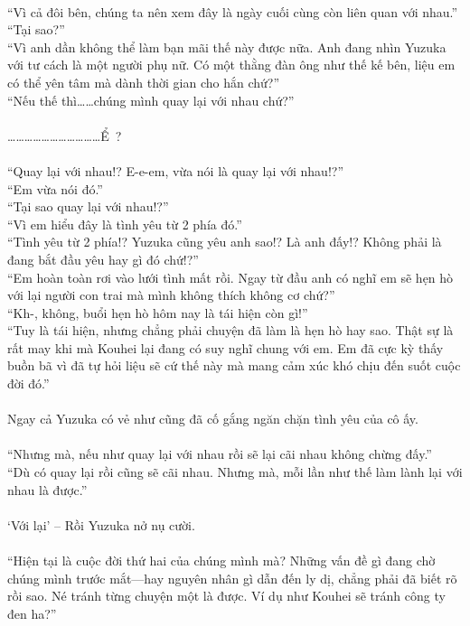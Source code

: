 \documentclass[12pt,a4paper, twosides]{book}
\begin{document}
\\
“Vì cả đôi bên, chúng ta nên xem đây là ngày cuối cùng còn liên quan với nhau.”\\
“Tại sao?”\\
“Vì anh dần không thể làm bạn mãi thế này được nữa. Anh đang nhìn Yuzuka với tư cách là một người phụ nữ. Có một thằng đàn ông như thế kế bên, liệu em có thể yên tâm mà dành thời gian cho hắn chứ?”\\
“Nếu thế thì……chúng mình quay lại với nhau chứ?”\\
\\
……………………………Ể~?\\
\\
“Quay lại với nhau!? E-e-em, vừa nói là quay lại với nhau!?”\\
“Em vừa nói đó.”\\
“Tại sao quay lại với nhau!?”\\
“Vì em hiểu đây là tình yêu từ 2 phía đó.”\\
“Tình yêu từ 2 phía!? Yuzuka cũng yêu anh sao!? Là anh đấy!? Không phải là đang bắt đầu yêu hay gì đó chứ!?”\\
“Em hoàn toàn rơi vào lưới tình mất rồi. Ngay từ đầu anh có nghĩ em sẽ hẹn hò với lại người con trai mà mình không thích không cơ chứ?”\\
“Kh-, không, buổi hẹn hò hôm nay là tái hiện còn gì!”\\
“Tuy là tái hiện, nhưng chẳng phải chuyện đã làm là hẹn hò hay sao. Thật sự là rất may khi mà Kouhei lại đang có suy nghĩ chung với em. Em đã cực kỳ thấy buồn bã vì đã tự hỏi liệu sẽ cứ thế này mà mang cảm xúc khó chịu đến suốt cuộc đời đó.”\\
\\
Ngay cả Yuzuka có vẻ như cũng đã cố gắng ngăn chặn tình yêu của cô ấy.\\
\\
“Nhưng mà, nếu như quay lại với nhau rồi sẽ lại cãi nhau không chừng đấy.”\\
“Dù có quay lại rồi cũng sẽ cãi nhau. Nhưng mà, mỗi lần như thế làm lành lại với nhau là được.”\\
\\
‘Với lại’ – Rồi Yuzuka nở nụ cười.\\
\\
“Hiện tại là cuộc đời thứ hai của chúng mình mà? Những vấn đề gì đang chờ chúng mình trước mắt—hay nguyên nhân gì dẫn đến ly dị, chẳng phải đã biết rõ rồi sao. Né tránh từng chuyện một là được. Ví dụ như Kouhei sẽ tránh công ty đen ha?”\\
\end{document}
